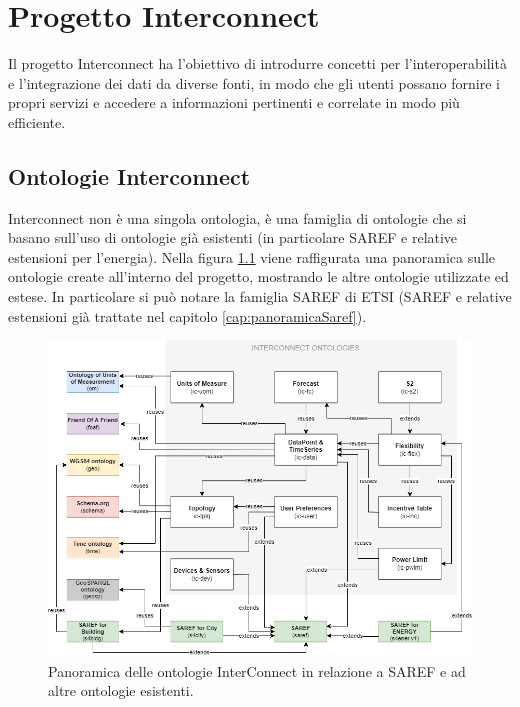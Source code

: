 \chapter{Progetto Interconnect}

Il progetto Interconnect ha l'obiettivo di introdurre concetti per l'interoperabilità e l'integrazione dei dati da diverse fonti, in modo che gli utenti possano fornire i propri servizi e accedere a informazioni pertinenti e correlate in modo più efficiente.


\section{Ontologie Interconnect}
Interconnect non è una singola ontologia, è una famiglia di ontologie che si basano sull'uso di ontologie già esistenti (in particolare SAREF e relative estensioni per l'energia).
Nella figura \ref{fig:panoramicaInterconnect} viene raffigurata una panoramica sulle ontologie create all'interno del progetto, mostrando le altre ontologie utilizzate ed estese. In particolare si può notare la famiglia SAREF di ETSI (SAREF e relative estensioni già trattate nel capitolo \ref{cap:panoramicaSaref}).
\begin{figure}[H]
    \centering
    \includegraphics[width=\textwidth]{figures/panoramicaInterconnect.png}
    \caption{Panoramica delle ontologie InterConnect in relazione a SAREF e ad altre ontologie esistenti.}
    \label{fig:panoramicaInterconnect}
\end{figure}

